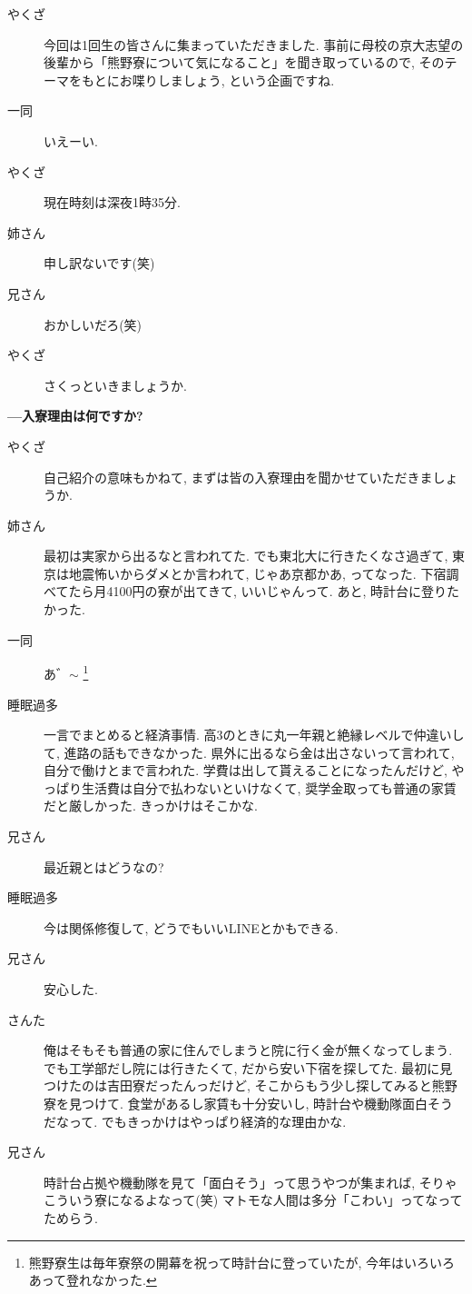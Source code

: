 \documentclass[10pt,b5jsbook,dvips,dvipdfmx,openany]{jsbook}
\theoremstyle{definition}
\begin{document}
		\begin{multicols}{2}
		\begin{description}
		\item[やくざ] 今回は1回生の皆さんに集まっていただきました. 事前に母校の京大志望の後輩から「熊野寮について気になること」を聞き取っているので, そのテーマをもとにお喋りしましょう, という企画ですね. 
		\item[ 一同 ] いえーい. 
		\item[やくざ] 現在時刻は深夜1時35分. 
		\item[姉さん] 申し訳ないです(笑)
		\item[兄さん] おかしいだろ(笑)
		\item[やくざ] さくっといきましょうか. 
		\end{description}

		\textbf{---入寮理由は何ですか? }
		\begin{description}
		\item[やくざ]自己紹介の意味もかねて, まずは皆の入寮理由を聞かせていただきましょうか. 
		\item[姉さん]最初は実家から出るなと言われてた. でも東北大に行きたくなさ過ぎて, 東京は地震怖いからダメとか言われて, じゃあ京都かあ, ってなった. 下宿調べてたら月4100円の寮が出てきて, いいじゃんって. あと, 時計台に登りたかった. 
		\item[ 一同 ]あ゛$\sim$ \footnote{熊野寮生は毎年寮祭の開幕を祝って時計台に登っていたが, 今年はいろいろあって登れなかった. }
		\item[睡眠過多]一言でまとめると経済事情. 高3のときに丸一年親と絶縁レベルで仲違いして, 進路の話もできなかった. 県外に出るなら金は出さないって言われて, 自分で働けとまで言われた. 学費は出して貰えることになったんだけど, やっぱり生活費は自分で払わないといけなくて, 奨学金取っても普通の家賃だと厳しかった. きっかけはそこかな. 
		\item[兄さん]最近親とはどうなの? 
		\item[睡眠過多]今は関係修復して, どうでもいいLINEとかもできる. 
		\item[兄さん]安心した. 
		\item[さんた]俺はそもそも普通の家に住んでしまうと院に行く金が無くなってしまう. でも工学部だし院には行きたくて, だから安い下宿を探してた. 最初に見つけたのは吉田寮だったんっだけど, そこからもう少し探してみると熊野寮を見つけて. 食堂があるし家賃も十分安いし, 時計台や機動隊面白そうだなって. でもきっかけはやっぱり経済的な理由かな. 
		\item[兄さん]時計台占拠や機動隊を見て「面白そう」って思うやつが集まれば, そりゃこういう寮になるよなって(笑) マトモな人間は多分「こわい」ってなってためらう. 

\end{description}
\end{multicols}
\end{document}
